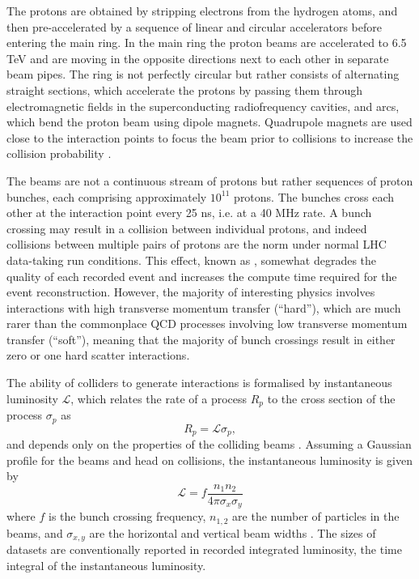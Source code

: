The protons are obtained by stripping electrons from the hydrogen atoms,
and then pre-accelerated by a sequence of linear and circular accelerators
before entering the main ring. In the main ring the proton beams are
accelerated to 6.5 TeV and are moving in the opposite directions next to each other
in separate beam pipes. The ring is not perfectly circular but rather consists
of alternating straight sections, which accelerate the protons by passing
them through electromagnetic fields in the superconducting radiofrequency
cavities, and arcs, which bend the proton beam using dipole magnets.
Quadrupole magnets are used close to the interaction points to focus the
beam prior to collisions to increase the collision probability \cite{Brüning:782076}. 

The beams are not a continuous stream of protons but rather sequences of
proton bunches, each comprising approximately $10^{11}$ protons. The
bunches cross each other at the interaction point every 25 ns, i.e. at a
40 MHz rate. A bunch crossing may result in a collision between
individual protons, and indeed collisions between multiple pairs of
protons are the norm under normal LHC data-taking run conditions.
This effect, known as \pileup, somewhat degrades the quality of
each recorded event and increases the compute time required for the
event reconstruction. However, the majority of interesting physics
involves interactions with high transverse momentum transfer (``hard''),
which are much rarer than the commonplace QCD processes involving
low transverse momentum transfer (``soft''), meaning that the majority
of bunch crossings result in either zero or one hard scatter interactions.

The ability of colliders to generate interactions is formalised by
instantaneous luminosity $\mathcal{L}$, which relates the rate of a process $R_p$
to the cross section of the process $\sigma_p$ as
\begin{equation}
R_p = \mathcal{L} \sigma_p,
\end{equation}
and depends only on the properties of the colliding beams \cite{Thomson:2013zua}. Assuming a
Gaussian profile for the beams and head on collisions, the
instantaneous luminosity is given by
\begin{equation}
\mathcal{L} = f \frac{n_1 n_2 }{4 \pi \sigma_x \sigma_y}
\end{equation}
where $f$ is the bunch crossing frequency, $n_{1, 2}$ are the number of
particles in the beams, and $\sigma_{x,y}$ are the horizontal and vertical
beam widths \cite{Thomson:2013zua}. The sizes of datasets are conventionally
reported in recorded integrated luminosity, the time integral of the
instantaneous luminosity. 


